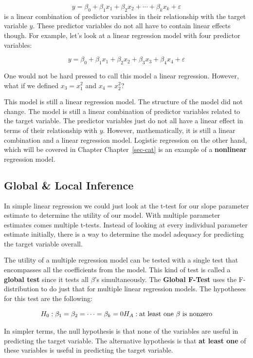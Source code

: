 \documentclass[
  letterpaper,
  DIV=11,
  numbers=noendperiod]{scrreprt}
\begin{document}
\[
y = \beta_0 + \beta_1 x_1 + \beta_2 x_2 + \cdots + \beta_k x_k + \varepsilon
\] is a linear combination of predictor variables in their relationship
with the target variable \(y\). These predictor variables do not all
have to contain linear effects though. For example, let's look at a
linear regression model with four predictor variables:

\[
y = \beta_0 + \beta_1 x_1 + \beta_2 x_2 + \beta_3 x_3 + \beta_4 x_4 + \varepsilon
\]

One would not be hard pressed to call this model a linear regression.
However, what if we defined \(x_3 = x_1^2\) and \(x_4 = x_2^2\)?

This model is still a linear regression model. The structure of the
model did not change. The model is still a linear combination of
predictor variables related to the target variable. The predictor
variables just do not all have a linear effect in terms of their
relationship with \(y\). However, mathematically, it is still a linear
combination and a linear regression model. Logistic regression on the
other hand, which will be covered in Chapter Chapter~\ref{sec-cat} is an
example of a \textbf{nonlinear} regression model.

\hypertarget{global-local-inference}{%
\subsection{Global \& Local Inference}\label{global-local-inference}}

In simple linear regression we could just look at the t-test for our
slope parameter estimate to determine the utility of our model. With
multiple parameter estimates comes multiple t-tests. Instead of looking
at every individual parameter estimate initially, there is a way to
determine the model adequacy for predicting the target variable overall.

The utility of a multiple regression model can be tested with a single
test that encompasses all the coefficients from the model. This kind of
test is called a \textbf{global test} since it tests all \(\beta\)'s
simultaneously. The \textbf{Global F-Test} uses the F-distribution to do
just that for multiple linear regression models. The hypotheses for this
test are the following:

\[
H_0: \beta_1 = \beta_2 = \cdots = \beta_k = 0 \\
H_A: \text{at least one } \beta \text{ is nonzero}
\]

In simpler terms, the null hypothesis is that none of the variables are
useful in predicting the target variable. The alternative hypothesis is
that \textbf{at least one} of these variables is useful in predicting
the target variable.
\end{document}
